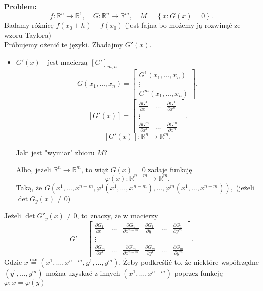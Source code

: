\documentclass[../main.tex]{subfiles}
\begin{document}
\textbf{Problem:}
    \[
        f:\mathbb{R}^n\to\mathbb{R}^1,\quad G:\mathbb{R}^n\to\mathbb{R}^m,\quad M=\left\{ x: G(x) = 0 \right\}
    .\]
    Badamy różnicę $f(x_0+h) - f(x_0)$ (jest fajna bo możemy ją rozwinąć ze wzoru Taylora)\\
    Próbujemy ożenić te języki. Zbadajmy $G'(x)$.
    \begin{itemize}
        \item $G'(x)$ - jest macierzą $\left[ G' \right]_{m,n} $
            \[
                G(x_1,\ldots,x_n) =
                \begin{bmatrix}
                G^1(x_1,\ldots,x_n)\\
                \vdots\\
                G^m(x_1,\ldots,x_n)
                \end{bmatrix}
            .\]
            \[
                \left[ G'(x) \right] =
                \begin{bmatrix}
                \frac{\partial G^1}{\partial x^1} & \ldots & \frac{\partial G^1}{\partial x^n} \\
                \vdots\\
                \frac{\partial G^m}{\partial x^1} & \ldots & \frac{\partial G^m}{\partial x^n}  \end{bmatrix}
            .\]
            \[
                \left[ G'(x) \right] : \mathbb{R}^n\to\mathbb{R}^m
            .\]

        \begin{pytanie}
               Jaki jest "wymiar" zbioru $M$?
        \end{pytanie}
        Albo, jeżeli $\mathbb{R}^n\to\mathbb{R}^m$, to wiąż $G(x) = 0$ zadaje funkcję \[
            \varphi(x): \mathbb{R}^{n-m}\to\mathbb{R}^{m}
        .\] Taką, że $G(x^1,\ldots,x^{n-m}, \varphi^1(x^1,\ldots,x^{n-m}),\ldots,\varphi^m(x^1,\ldots,x^{n-m})),$ (jeżeli $\det G_y(x) \neq 0$)

    \end{itemize}

    Jeżeli $\det G'_y (x) \neq 0$, to znaczy, że w macierzy \[
    G' =
    \begin{bmatrix}
        \frac{\partial G_1}{\partial x^1} &\ldots &\frac{\partial G_1}{\partial x^{n-m}} & \frac{\partial G_1}{\partial y^1} &\ldots &\frac{\partial G_1}{\partial y^m}\\
    \vdots \\
\frac{\partial G_m}{\partial x^1} & \ldots & \frac{\partial G_m}{\partial x^{n-m}} & \frac{\partial G_m}{\partial y^1} &\ldots &\frac{\partial G_m}{\partial y^m}
\end{bmatrix}
    .\]
    Gdzie $x \overset{\text{ozn}}{=} (x^1,\ldots,x^{n-m},y^1,\ldots,y^{m})$. Żeby podkreślić to, że niektóre współrzędne $(y^1,\ldots,y^m)$ można uzyskać z innych $(x^1,\ldots,x^{n-m})$ poprzez funkcję $\varphi: x = \varphi(y)$
\end{document}
